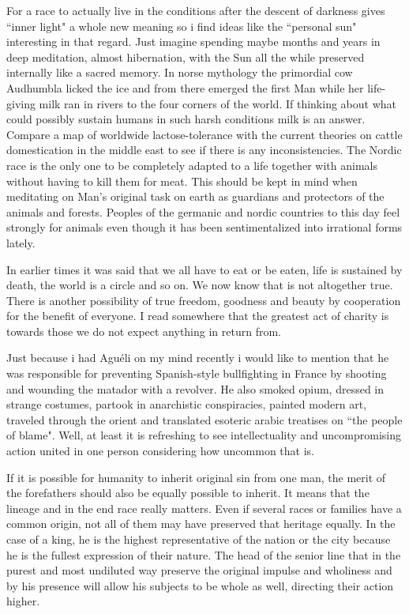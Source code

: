 \begin{footnotesize}
\begin{sffamily}
For a race to actually live in the conditions after the descent of darkness gives ``inner light" a whole new meaning so i find ideas like the ``personal sun" interesting in that regard. Just imagine spending maybe months and years in deep meditation, almost hibernation, with the Sun all the while preserved internally like a sacred memory. In norse mythology the primordial cow Audhumbla licked the ice and from there emerged the first Man while her life-giving milk ran in rivers to the four corners of the world. If thinking about what could possibly sustain humans in such harsh conditions milk is an answer. Compare a map of worldwide lactose-tolerance with the current theories on cattle domestication in the middle east to see if there is any inconsistencies. The Nordic race is the only one to be completely adapted to a life together with animals without having to kill them for meat. This should be kept in mind when meditating on Man's original task on earth as guardians and protectors of the animals and forests. Peoples of the germanic and nordic countries to this day feel strongly for animals even though it has been sentimentalized into irrational forms lately.

In earlier times it was said that we all have to eat or be eaten, life is sustained by death, the world is a circle and so on. We now know that is not altogether true. There is another possibility of true freedom, goodness and beauty by cooperation for the benefit of everyone. I read somewhere that the greatest act of charity is towards those we do not expect anything in return from.

Just because i had Aguéli on my mind recently i would like to mention that he was responsible for preventing Spanish-style bullfighting in France by shooting and wounding the matador with a revolver. He also smoked opium, dressed in strange costumes, partook in anarchistic conspiracies, painted modern art, traveled through the orient and translated esoteric arabic treatises on ``the people of blame". Well, at least it is refreshing to see intellectuality and uncompromising action united in one person considering how uncommon that is.

If it is possible for humanity to inherit original sin from one man, the merit of the forefathers should also be equally possible to inherit. It means that the lineage and in the end race really matters. Even if several races or families have a common origin, not all of them may have preserved that heritage equally. In the case of a king, he is the highest representative of the nation or the city because he is the fullest expression of their nature. The head of the senior line that in the purest and most undiluted way preserve the original impulse and wholiness and by his presence will allow his subjects to be whole as well, directing their action higher.


\end{sffamily}
\end{footnotesize}
